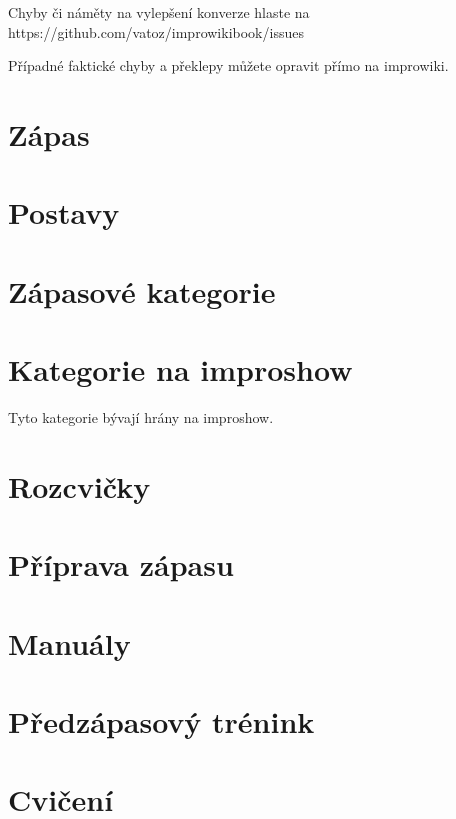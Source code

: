 \documentclass[a4paper,10pt,openany]{book}
\begin{document}
Chyby či náměty na vylepšení konverze hlaste na https://github.com/vatoz/improwikibook/issues

Případné faktické chyby a překlepy můžete opravit přímo na improwiki.
\chapter{Zápas}







\chapter{Postavy}



\chapter{Zápasové kategorie}
\label{zápasové kategorie}
\label{:kategorie:zápasové kategorie}



\chapter{Kategorie na improshow}\label{další kategorie}
\label{:kategorie:kategorie na improshow}
Tyto kategorie bývají hrány na improshow.


\chapter{Rozcvičky}\label{rozcvičky}
\label{:kategorie:rozcvičky}





\chapter{Příprava zápasu}


\chapter{Manuály}


\chapter{Předzápasový trénink}


\chapter{Cvičení}

\end{document}
